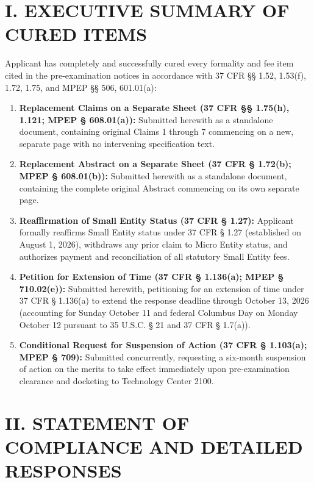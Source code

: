 \documentclass[11pt,letterpaper]{article}
\begin{document}
\section*{I. EXECUTIVE SUMMARY OF CURED ITEMS}

Applicant has completely and successfully cured every formality and fee item cited in the pre-examination notices in accordance with 37 CFR \S\S{} 1.52, 1.53(f), 1.72, 1.75, and MPEP \S\S{} 506, 601.01(a):

\begin{enumerate}[leftmargin=2em, itemsep=3pt, parsep=0pt]
    \item \textbf{Replacement Claims on a Separate Sheet (37 CFR \S\S{} 1.75(h), 1.121; MPEP \S{} 608.01(a)):} Submitted herewith as a standalone document, containing original Claims 1 through 7 commencing on a new, separate page with no intervening specification text.
    \item \textbf{Replacement Abstract on a Separate Sheet (37 CFR \S{} 1.72(b); MPEP \S{} 608.01(b)):} Submitted herewith as a standalone document, containing the complete original Abstract commencing on its own separate page.
    \item \textbf{Reaffirmation of Small Entity Status (37 CFR \S{} 1.27):} Applicant formally reaffirms Small Entity status under 37 CFR \S{} 1.27 (established on August 1, 2026), withdraws any prior claim to Micro Entity status, and authorizes payment and reconciliation of all statutory Small Entity fees.
    \item \textbf{Petition for Extension of Time (37 CFR \S{} 1.136(a); MPEP \S{} 710.02(e)):} Submitted herewith, petitioning for an extension of time under 37 CFR \S{} 1.136(a) to extend the response deadline through October 13, 2026 (accounting for Sunday October 11 and federal Columbus Day on Monday October 12 pursuant to 35 U.S.C. \S{} 21 and 37 CFR \S{} 1.7(a)).
    \item \textbf{Conditional Request for Suspension of Action (37 CFR \S{} 1.103(a); MPEP \S{} 709):} Submitted concurrently, requesting a six-month suspension of action on the merits to take effect immediately upon pre-examination clearance and docketing to Technology Center 2100.
\end{enumerate}

\newpage

\section*{II. STATEMENT OF COMPLIANCE AND DETAILED RESPONSES}
\end{document}

